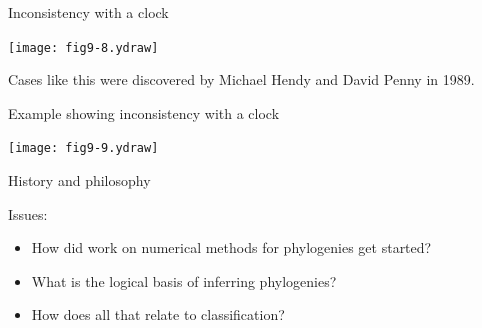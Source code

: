 \documentclass[bluish,slideColor,colorBG,pdf]{prosper}
\begin{document}
\begin{slide}[Replace]{Inconsistency with a clock}

\centerline{\texttt{[image: fig9-8.ydraw]}}
\bigskip

Cases like this were discovered by Michael Hendy and David Penny in 1989.

\end{slide}
 
\begin{slide}[Replace]{Example showing inconsistency with a clock}

\centerline{\texttt{[image: fig9-9.ydraw]}}

\end{slide}

\begin{slide}[Replace]{History and philosophy}
\bigskip

Issues:
\begin{itemize}
\item How did work on numerical methods for phylogenies get started?
\item What is the logical basis of inferring phylogenies?
\item How does all that relate to classification?
\end{itemize}

\end{slide}
\end{document}
